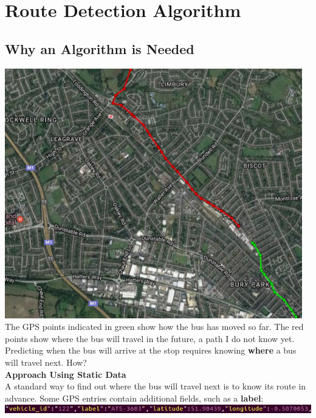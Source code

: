 \documentclass[12pt,a4paper,oneside,openright]{report}
\begin{document}
\section{Route Detection Algorithm}

\subsection{Why an Algorithm is Needed}

\includegraphics[scale=0.8]{figs/route_detector.png} \\

The GPS points indicated in green show how the bus has moved so far.
The red points show where the bus will travel in the future,
a path I do not know yet. Predicting when the bus will arrive at the stop
requires knowing \textbf{where} a bus will travel next. How? \\

\textbf{Approach Using Static Data} \\

A standard way to find out where the bus will travel next is to know its 
route in advance. Some GPS entries contain additional fields,
such as a \textbf{label}: \\

\includegraphics[width=\textwidth, scale=1.2]{figs/labelled_entry.png} \\
\end{document}
